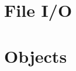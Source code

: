 \documentclass[12pt]{scrbook}
\begin{document}
\chapter{File I/O}
\label{chapter:php:fileIO}


\chapter{Objects}
\label{chapter:php:objects}


\backmatter

\newpage
\printglossaries
\forallglsentries{\thislabel}%
{%
  \ifglsused{\thislabel}{}{\glsadd[format=ignore]{\thislabel}}%
}

{}
\printindex
{}

{}
\nocite{*}

%

\end{document}
